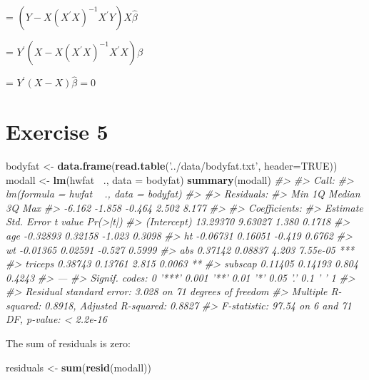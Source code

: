 \documentclass[]{article}
\newenvironment{Shaded}{\begin{snugshade}}{\end{snugshade}}
\newcommand{\CommentTok}[1]{\textcolor[rgb]{0.56,0.35,0.01}{\textit{#1}}}
\newcommand{\DataTypeTok}[1]{\textcolor[rgb]{0.13,0.29,0.53}{#1}}
\newcommand{\KeywordTok}[1]{\textcolor[rgb]{0.13,0.29,0.53}{\textbf{#1}}}
\newcommand{\NormalTok}[1]{#1}
\newcommand{\OperatorTok}[1]{\textcolor[rgb]{0.81,0.36,0.00}{\textbf{#1}}}
\newcommand{\OtherTok}[1]{\textcolor[rgb]{0.56,0.35,0.01}{#1}}
\newcommand{\StringTok}[1]{\textcolor[rgb]{0.31,0.60,0.02}{#1}}
\begin{document}
= \((Y - X(X^{\prime} X)^{-1} X^{\prime} Y) X \hat{\beta}\)

= \(Y^{\prime} (X - X(X^{\prime} X)^{-1} X^{\prime} X) \beta\)

= \(Y^{\prime} (X-X) \hat{\beta} = 0\)

\newpage

\hypertarget{exercise-5}{%
\section{Exercise 5}\label{exercise-5}}

\begin{Shaded}
\begin{Highlighting}[]
\NormalTok{bodyfat <-}\StringTok{ }\KeywordTok{data.frame}\NormalTok{(}\KeywordTok{read.table}\NormalTok{(}\StringTok{'../data/bodyfat.txt'}\NormalTok{, }\DataTypeTok{header=}\OtherTok{TRUE}\NormalTok{))}
\NormalTok{modall <-}\StringTok{ }\KeywordTok{lm}\NormalTok{(hwfat }\OperatorTok{~}\NormalTok{., }\DataTypeTok{data =}\NormalTok{ bodyfat)}
\KeywordTok{summary}\NormalTok{(modall)}
\CommentTok{#> }
\CommentTok{#> Call:}
\CommentTok{#> lm(formula = hwfat ~ ., data = bodyfat)}
\CommentTok{#> }
\CommentTok{#> Residuals:}
\CommentTok{#>    Min     1Q Median     3Q    Max }
\CommentTok{#> -6.162 -1.858 -0.464  2.502  8.177 }
\CommentTok{#> }
\CommentTok{#> Coefficients:}
\CommentTok{#>             Estimate Std. Error t value Pr(>|t|)    }
\CommentTok{#> (Intercept) 13.29370    9.63027   1.380   0.1718    }
\CommentTok{#> age         -0.32893    0.32158  -1.023   0.3098    }
\CommentTok{#> ht          -0.06731    0.16051  -0.419   0.6762    }
\CommentTok{#> wt          -0.01365    0.02591  -0.527   0.5999    }
\CommentTok{#> abs          0.37142    0.08837   4.203 7.55e-05 ***}
\CommentTok{#> triceps      0.38743    0.13761   2.815   0.0063 ** }
\CommentTok{#> subscap      0.11405    0.14193   0.804   0.4243    }
\CommentTok{#> ---}
\CommentTok{#> Signif. codes:  0 '***' 0.001 '**' 0.01 '*' 0.05 '.' 0.1 ' ' 1}
\CommentTok{#> }
\CommentTok{#> Residual standard error: 3.028 on 71 degrees of freedom}
\CommentTok{#> Multiple R-squared:  0.8918, Adjusted R-squared:  0.8827 }
\CommentTok{#> F-statistic: 97.54 on 6 and 71 DF,  p-value: < 2.2e-16}
\end{Highlighting}
\end{Shaded}

The sum of residuals is zero:

\begin{Shaded}
\begin{Highlighting}[]
\NormalTok{residuals <-}\StringTok{ }\KeywordTok{sum}\NormalTok{(}\KeywordTok{resid}\NormalTok{(modall))}
\end{Highlighting}
\end{Shaded}
\end{document}
